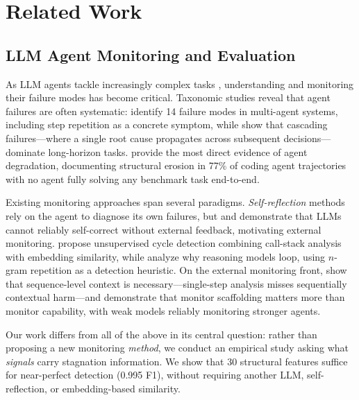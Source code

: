 \section{Related Work}
\label{sec:related_work}

\subsection{LLM Agent Monitoring and Evaluation}

As LLM agents tackle increasingly complex tasks \citep{jimenez2024swebench,yang2024sweagent,wang2025openhands,zhou2024webarena,wang2024mint}, understanding and monitoring their failure modes has become critical.
Taxonomic studies reveal that agent failures are often systematic: \citet{cemri2025multiagentfail} identify 14 failure modes in multi-agent systems, including step repetition as a concrete symptom, while \citet{zhu2025agentfail} show that cascading failures---where a single root cause propagates across subsequent decisions---dominate long-horizon tasks.
\citet{orlanski2026slopcodebench} provide the most direct evidence of agent degradation, documenting structural erosion in 77\% of coding agent trajectories with no agent fully solving any benchmark task end-to-end.

Existing monitoring approaches span several paradigms.
\emph{Self-reflection} methods \citep{shinn2023reflexion,yao2023tot,zhou2024lats} rely on the agent to diagnose its own failures, but \citet{huang2024selfcorrect} and \citet{kamoi2024selfcorrection} demonstrate that LLMs cannot reliably self-correct without external feedback, motivating external monitoring.
\citet{george2025cycledetection} propose unsupervised cycle detection combining call-stack analysis with embedding similarity, while \citet{pipis2025reasoningloop} analyze why reasoning models loop, using $n$-gram repetition as a detection heuristic.
On the external monitoring front, \citet{chen2025monitoring} show that sequence-level context is necessary---single-step analysis misses sequentially contextual harm---and \citet{kale2025weaktostrong} demonstrate that monitor scaffolding matters more than monitor capability, with weak models reliably monitoring stronger agents.

Our work differs from all of the above in its central question: rather than proposing a new monitoring \emph{method}, we conduct an empirical study asking what \emph{signals} carry stagnation information.
We show that 30 structural features suffice for near-perfect detection (0.995 F1), without requiring another LLM, self-reflection, or embedding-based similarity.

